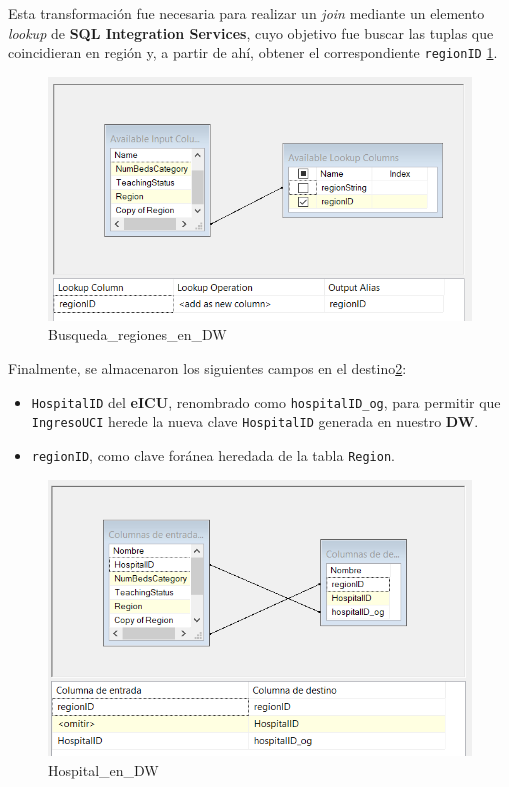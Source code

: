\documentclass[12pt, a4paper, twoside]{article}
\begin{document}
	Esta transformación fue necesaria para realizar un \textit{join} mediante un elemento \textit{lookup} de \textbf{SQL Integration Services}, cuyo objetivo fue buscar las tuplas que coincidieran en región y, a partir de ahí, obtener el correspondiente \texttt{regionID} \ref{fig:22}.
	
	\begin{figure}[h!]
		\centering
		\includegraphics[width=1\textwidth]{image/105_cargahospital_lookup.png}
		\caption{Busqueda\_regiones\_en\_DW}
		\label{fig:22}
	\end{figure}
	
	Finalmente, se almacenaron los siguientes campos en el destino\ref{fig:23}:
	
	\begin{itemize}
		\item \texttt{HospitalID} del \textbf{eICU}, renombrado como \texttt{hospitalID\_og}, para permitir que \texttt{IngresoUCI} herede la nueva clave \texttt{HospitalID} generada en nuestro \textbf{DW}.
		\item \texttt{regionID}, como clave foránea heredada de la tabla \texttt{Region}.
	\end{itemize}
	
	\begin{figure}[h!]
		\centering
		\includegraphics[width=1\textwidth]{image/105_cargahospital_destino.png}
		\caption{Hospital\_en\_DW}
		\label{fig:23}
	\end{figure}
	
\end{document}
